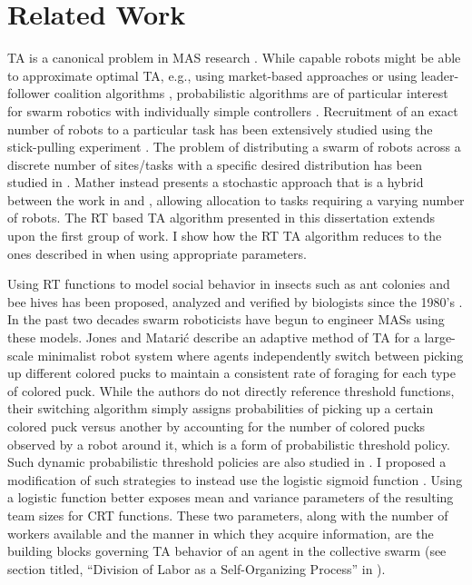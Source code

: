\documentclass[defaultstyle,12pt]{thesis}
\begin{document}
\section{Related Work}\label{sec:relwork}
TA is a canonical problem in MAS research \cite{Gerkey2004}. While capable robots might be able to approximate optimal TA, e.g., using market-based approaches \cite{Amstutz2008,Vig2007} or using  leader-follower coalition algorithms \cite{Chen2011}, probabilistic algorithms are of particular interest for swarm robotics with individually simple controllers \cite{Dantu2012}. Recruitment of an exact number of robots to a particular task has been extensively studied using the stick-pulling experiment \cite{Lerman2001,Martinoli2004}. The problem of distributing a swarm of robots across a discrete number of sites/tasks with a specific desired distribution has been studied in \cite{Berman2009,Correll2008}. Mather \cite{Mather2010} instead presents a stochastic approach that is a hybrid between the work in \cite{Berman2009} and \cite{Martinoli2004}, allowing allocation to tasks requiring a varying number of robots. The RT based TA algorithm presented in this dissertation extends upon the first group of work. I show how the RT TA algorithm reduces to the ones described in \cite{Lerman2001,Martinoli2004} when using appropriate parameters. 

Using RT functions to model social behavior in insects such as ant colonies \cite{Bonabeau1996, Bonabeau1997} and bee hives \cite{Robinson1987, Robinson1992, PageJr1990} has been proposed, analyzed and verified by biologists since the 1980's \cite{Theraulaz1998}. In the past two decades swarm roboticists have begun to engineer MASs using these models. Jones and Matari\'c \cite{Jones2004} describe an adaptive method of TA for a large-scale minimalist robot system where agents independently switch between picking up different colored pucks to maintain a consistent rate of foraging for each type of colored puck. While the authors do not directly reference threshold functions, their switching algorithm simply assigns probabilities of picking up a certain colored puck versus another by accounting for the number of colored pucks observed by a robot around it, which is a form of probabilistic threshold policy. Such dynamic probabilistic threshold policies are also studied in \cite{Nouyan2002}. I proposed a modification of such strategies to instead use the logistic sigmoid function \cite{Kanakia2014}. Using a logistic function better exposes mean and variance parameters of the resulting team sizes for CRT functions. These two parameters, along with the number of workers available and the manner in which they acquire information, are the building blocks governing TA behavior of an agent in the collective swarm (see section titled, ``Division of Labor as a Self-Organizing Process'' in \cite{Robinson1992}).
\end{document}
